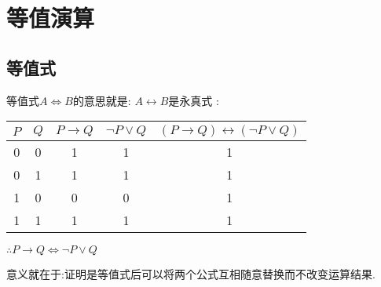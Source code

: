 {{ }%

\section{等值演算}{

  \subsection{等值式}{
    等值式$A \Leftrightarrow B$的意思就是: $A \leftrightarrow B$是永真式 :

    \begin{center}
      \begin{tabular}{c|c|c|c|c}
        \hline
        $P$ & $Q$ & $P \to Q$ & $\lnot P \lor Q$ & $(P \to Q) \leftrightarrow (\lnot P \lor Q)$ \\
        \hline
        0   & 0   & 1         & 1                & 1                                            \\
        0   & 1   & 1         & 1                & 1                                            \\
        1   & 0   & 0         & 0                & 1                                            \\
        1   & 1   & 1         & 1                & 1                                            \\
        \hline
      \end{tabular}
    \end{center}

    $\therefore P \to Q \Leftrightarrow \lnot P \lor Q$

    意义就在于:证明是等值式后可以将两个公式互相随意替换而不改变运算结果.
  }%

}}
